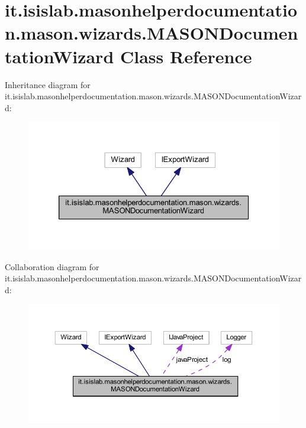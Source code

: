 \hypertarget{classit_1_1isislab_1_1masonhelperdocumentation_1_1mason_1_1wizards_1_1_m_a_s_o_n_documentation_wizard}{\section{it.\-isislab.\-masonhelperdocumentation.\-mason.\-wizards.\-M\-A\-S\-O\-N\-Documentation\-Wizard Class Reference}
\label{classit_1_1isislab_1_1masonhelperdocumentation_1_1mason_1_1wizards_1_1_m_a_s_o_n_documentation_wizard}
}


Inheritance diagram for it.\-isislab.\-masonhelperdocumentation.\-mason.\-wizards.\-M\-A\-S\-O\-N\-Documentation\-Wizard\-:
\nopagebreak
\begin{figure}[H]
\begin{center}
\leavevmode
\includegraphics[width=326pt]{classit_1_1isislab_1_1masonhelperdocumentation_1_1mason_1_1wizards_1_1_m_a_s_o_n_documentation_wizard__inherit__graph}
\end{center}
\end{figure}


Collaboration diagram for it.\-isislab.\-masonhelperdocumentation.\-mason.\-wizards.\-M\-A\-S\-O\-N\-Documentation\-Wizard\-:
\nopagebreak
\begin{figure}[H]
\begin{center}
\leavevmode
\includegraphics[width=350pt]{classit_1_1isislab_1_1masonhelperdocumentation_1_1mason_1_1wizards_1_1_m_a_s_o_n_documentation_wizard__coll__graph}
\end{center}
\end{figure}
